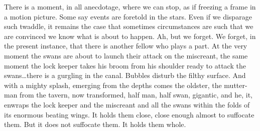 There is a moment, in all anecdotage, where we can stop, as if freezing a frame in a motion picture. Some say events are foretold in the stars. Even if we disparage such twaddle, it remains the case that sometimes circumstances are such that we are convinced we know what is about to happen. Ah, but we forget. We forget, in the present instance, that there is another fellow who plays a part. At the very moment the swans are about to launch their attack on the miscreant, the same moment the lock keeper takes his broom from his shoulder ready to attack the swans\ldots  there is a gurgling in the canal. Bubbles disturb the filthy surface. And with a mighty splash, emerging from the depths comes the oldster, the mutter-man from the tavern, now transformed, half man, half swan, gigantic, and he, it, enwraps the lock keeper and the miscreant and all the swans within the folds of its enormous beating wings. It holds them close, close enough almost to suffocate them. But it does not suffocate them. It holds them whole.